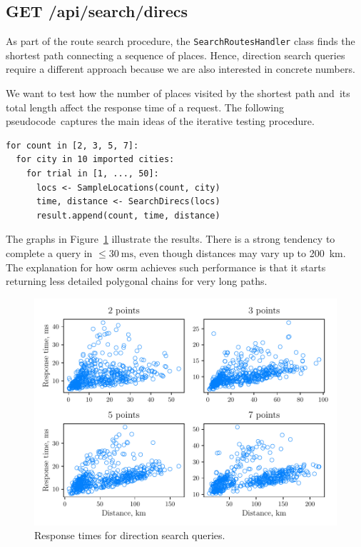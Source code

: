 \newpage

\subsection*{GET /api/search/direcs}

As part of the route search procedure, the \texttt{SearchRoutesHandler} class finds the shortest path connecting a sequence of places. Hence, direction search queries require a different approach because we are also interested in concrete numbers.

We want to test how the number of places visited by the shortest path and~its total length affect the response time of a request. The following pseudocode~cap\-tures the main ideas of the iterative testing procedure.

\begin{verbatim}
for count in [2, 3, 5, 7]:
  for city in 10 imported cities:
    for trial in [1, ..., 50]:
      locs <- SampleLocations(count, city)
      time, distance <- SearchDirecs(locs)
      result.append(count, time, distance)
\end{verbatim}

The graphs in Figure~\ref{fig:perf-search-direcs} illustrate the results. There is a strong tendency to complete a query in $\leq 30~\text{ms}$, even though distances may vary up to 200~km. The explanation for how \acs{osrm} achieves such performance is that it starts returning less detailed polygonal chains for very long paths.

\vspace{3.0em}

\begin{figure}[!h]
  \centering
  \includegraphics[width=\linewidth]{img/testing/perf-search-direcs.pdf}
  \caption{Response times for direction search queries.}
  \label{fig:perf-search-direcs}
\end{figure}

